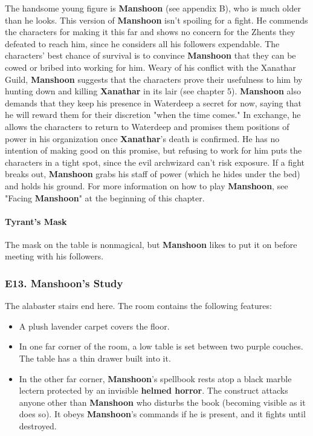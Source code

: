 \documentclass[10pt,a4paper,twoside,twocolumn,openany,nodeprecatedcode]{dndbook}
\begin{document}
The handsome young figure is \textbf{Manshoon} (see appendix B), who is much older than he looks.
This version of \textbf{Manshoon} isn't spoiling for a fight. He commends the characters for making it this far and shows no concern for the Zhents they defeated to reach him, since he considers all his followers expendable.
The characters' best chance of survival is to convince \textbf{Manshoon} that they can be cowed or bribed into working for him. Weary of his conflict with the Xanathar Guild, \textbf{Manshoon} suggests that the characters prove their usefulness to him by hunting down and killing \textbf{Xanathar} in its lair (see chapter 5). \textbf{Manshoon} also demands that they keep his presence in Waterdeep a secret for now, saying that he will reward them for their discretion "when the time comes." In exchange, he allows the characters to return to Waterdeep and promises them positions of power in his organization once \textbf{Xanathar}'s death is confirmed. He has no intention of making good on this promise, but refusing to work for him puts the characters in a tight spot, since the evil archwizard can't risk exposure.
If a fight breaks out, \textbf{Manshoon} grabs his staff of power (which he hides under the bed) and holds his ground. For more information on how to play \textbf{Manshoon}, see "Facing \textbf{Manshoon}" at the beginning of this chapter.
\paragraph{Tyrant's Mask}
The mask on the table is nonmagical, but \textbf{Manshoon} likes to put it on before meeting with his followers.
\subsubsection{E13. Manshoon's Study}
The alabaster stairs end here. The room contains the following features:
\begin{itemize}

\item A plush lavender carpet covers the floor.
\item In one far corner of the room, a low table is set between two purple couches. The table has a thin drawer built into it.
\item In the other far corner, \textbf{Manshoon}'s spellbook rests atop a black marble lectern protected by an invisible \textbf{helmed horror}. The construct attacks anyone other than \textbf{Manshoon} who disturbs the book (becoming visible as it does so). It obeys \textbf{Manshoon}'s commands if he is present, and it fights until destroyed.
\end{itemize}
\end{document}
